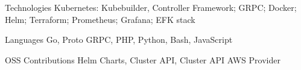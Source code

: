 


\begin{cvskills}


\cvskill
{Technologies} %
{Kubernetes: Kubebuilder, Controller Framework; GRPC; Docker; Helm; Terraform; Prometheus; Grafana; EFK stack} %


\cvskill
{Languages} %
{Go, Proto GRPC, PHP, Python, Bash, JavaScript}


\cvskill
{OSS Contributions} %
{Helm Charts, Cluster API, Cluster API AWS Provider}


\end{cvskills}
